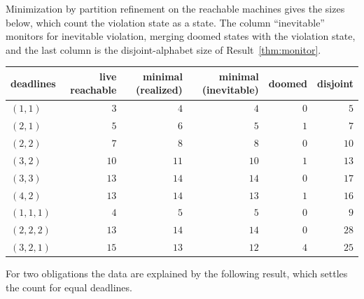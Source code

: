 Minimization by partition refinement on the reachable machines gives the sizes below, which count the violation state as a state. The column ``inevitable'' monitors for inevitable violation, merging doomed states with the violation state, and the last column is the disjoint-alphabet size of Result~\ref{thm:monitor}.
\begin{center}
\begin{tabular}{lrrrrr}
\toprule
deadlines & live reachable & minimal (realized) & minimal (inevitable) & doomed & disjoint\\
\midrule
$(1,1)$ & $3$ & $4$ & $4$ & $0$ & $5$\\
$(2,1)$ & $5$ & $6$ & $5$ & $1$ & $7$\\
$(2,2)$ & $7$ & $8$ & $8$ & $0$ & $10$\\
$(3,2)$ & $10$ & $11$ & $10$ & $1$ & $13$\\
$(3,3)$ & $13$ & $14$ & $14$ & $0$ & $17$\\
$(4,2)$ & $13$ & $14$ & $13$ & $1$ & $16$\\
$(1,1,1)$ & $4$ & $5$ & $5$ & $0$ & $9$\\
$(2,2,2)$ & $13$ & $14$ & $14$ & $0$ & $28$\\
$(3,2,1)$ & $15$ & $13$ & $12$ & $4$ & $25$\\
\bottomrule
\end{tabular}
\end{center}
For two obligations the data are explained by the following result, which settles the count for equal deadlines.

